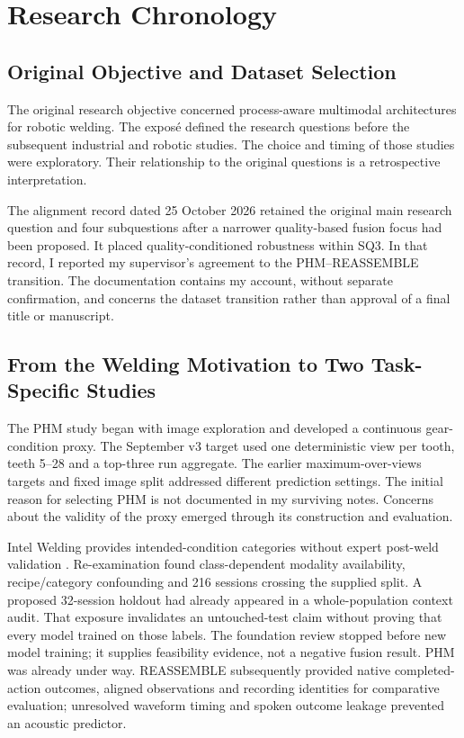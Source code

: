 \chapter{Research Chronology}
\label{app:chronology}
\section{Original Objective and Dataset Selection}
The original research objective concerned process-aware multimodal architectures for
robotic welding. The exposé defined the research questions before the subsequent
industrial and robotic studies. The choice and timing of those studies were exploratory.
Their relationship to the original questions is a retrospective
interpretation.

The alignment record dated 25 October 2026 retained the original main research question
and four subquestions after a narrower quality-based fusion focus had been proposed. It
placed quality-conditioned robustness within SQ3. In that record, I reported my supervisor's agreement to the PHM--REASSEMBLE transition.
The documentation contains my account, without separate confirmation, and concerns the
dataset transition rather than approval of a final title or manuscript.

\section{From the Welding Motivation to Two Task-Specific Studies}
The PHM study began with image exploration and developed a continuous gear-condition
proxy. The September v3 target used one deterministic view per tooth, teeth 5--28 and a
top-three run aggregate. The earlier maximum-over-views targets and fixed image split
addressed different prediction settings. The initial reason for selecting PHM is not documented in my surviving notes. Concerns about the validity of the proxy emerged
through its construction and evaluation.

Intel Welding provides intended-condition categories without expert post-weld validation
\parencite{Stemmer2024Welding,IntelWeldingHF2024}. Re-examination found class-dependent
modality availability, recipe/category confounding and 216 sessions crossing the supplied
split. A proposed 32-session holdout
had already appeared in a whole-population context audit. That exposure invalidates an
untouched-test claim without proving that every model trained on those labels. The
foundation review stopped before new model training; it supplies feasibility evidence,
not a negative fusion result. PHM was already under way. REASSEMBLE subsequently
provided native completed-action outcomes, aligned observations and recording identities
for comparative evaluation; unresolved waveform timing and spoken outcome leakage
prevented an acoustic predictor.

